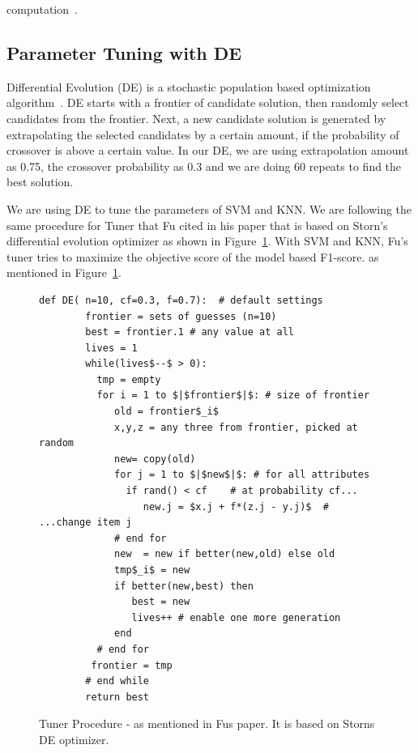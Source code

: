\documentclass[sigconf]{acmart}
\theoremstyle{break}
\begin{document}
    computation~\cite{tibshirani2001estimating}.
    
    \subsection{Parameter Tuning with DE}
    \label{sssec:Parameter Tuning with DE}
    Differential Evolution (DE) is a stochastic population based optimization algorithm~\cite{storn1997differential}. DE starts with a frontier of candidate solution, then randomly select candidates from the frontier. Next, a new candidate solution is generated by extrapolating the selected candidates by a certain amount, if the probability of crossover is above a certain value. In our DE, we are using extrapolation amount as 0.75, the crossover probability as 0.3 and we are doing 60 repeats to find the best solution.
    
    We are using DE to tune the parameters of SVM and KNN. We are following the same procedure for Tuner that Fu cited in his paper that is based on Storn's differential evolution optimizer as shown in Figure~\ref{fig:pseudo_DE}. With SVM and KNN, Fu's tuner tries to maximize the objective score of the model based F1-score. as mentioned in Figure~\ref{fig:pseudo_DE}.
    
    \begin{figure}[!t]
    \small 
    \begin{lstlisting}[mathescape,linewidth=7.5cm,frame=none,numbers=right ]
      def DE( n=10, cf=0.3, f=0.7):  # default settings
        frontier = sets of guesses (n=10)
        best = frontier.1 # any value at all
        lives = 1
        while(lives$--$ > 0): 
          tmp = empty
          for i = 1 to $|$frontier$|$: # size of frontier
             old = frontier$_i$
             x,y,z = any three from frontier, picked at random
             new= copy(old)  
             for j = 1 to $|$new$|$: # for all attributes
               if rand() < cf    # at probability cf...
                  new.j = $x.j + f*(z.j - y.j)$  # ...change item j
             # end for
             new  = new if better(new,old) else old
             tmp$_i$ = new 
             if better(new,best) then
                best = new
                lives++ # enable one more generation
             end                  
          # end for
         frontier = tmp
        # end while
        return best
    \end{lstlisting} 
    \caption{Tuner Procedure - as mentioned in Fu\textquotesingle s paper. It is based on Storn\textquotesingle s DE optimizer.}
    \label{fig:pseudo_DE} 
    \vspace{-0.3cm}
    \end{figure}
    
\end{document}
